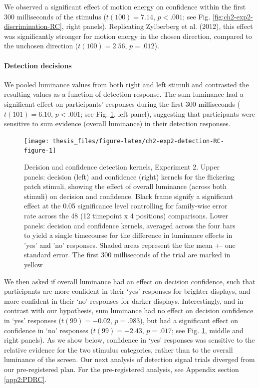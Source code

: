 \documentclass[12pt,twoside]{reedthesis}
\begin{document}
We observed a significant effect of motion energy on confidence within the first 300 milliseconds of the stimulus (\(t(100) = 7.14\), \(p < .001\); see Fig. \ref{fig:ch2-exp2-discrimination-RC}, right panels). Replicating Zylberberg et al. (2012), this effect was significantly stronger for motion energy in the chosen direction, compared to the unchosen direction (\(t(100) = 2.56\), \(p = .012\)).

\hypertarget{e2-det-RC}{%
\paragraph{Detection decisions}\label{e2-det-RC}}

We pooled luminance values from both right and left stimuli and contrasted the resulting values as a function of detection response. The sum luminance had a significant effect on participants' responses during the first 300 milliseconds (\(t(101) = 6.10\), \(p < .001\); see Fig. \ref{fig:ch2-exp2-detection-RC-figure}, left panel), suggesting that participants were sensitive to sum evidence (overall luminance) in their detection responses.
\begin{figure}
\texttt{[image: thesis\_files/figure-latex/ch2-exp2-detection-RC-figure-1]} \caption[Decision kernels in detection, Exp. 2]{Decision and confidence detection kernels, Experiment 2. Upper panels: decision (left) and confidence (right) kernels for the flickering patch stimuli, showing the effect of overall luminance (across both stimuli) on decision and confidence. Black frame signify a significant effect at the 0.05 significance level controlling for family-wise error rate across the 48 (12 timepoint x 4 positions) comparisons. Lower panels: decision and confidence kernels, averaged across the four bars to yield a single timecourse for the difference in luminance effects in 'yes' and 'no' responses. Shaded areas represent the the mean +- one standard error. The first 300 milliseconds of the trial are marked in yellow}\label{fig:ch2-exp2-detection-RC-figure}
\end{figure}
We then asked if overall luminance had an effect on decision confidence, such that participants are more confident in their `yes' responses for brighter displays, and more confident in their `no' responses for darker displays. Interestingly, and in contrast with our hypothesis, sum luminance had no effect on decision confidence in `yes' responses (\(t(99) = -0.02\), \(p = .983\)), but had a significant effect on confidence in `no' responses (\(t(99) = -2.43\), \(p = .017\); see Fig. \ref{fig:ch2-exp2-detection-RC-figure}, middle and right panels). As we show below, confidence in `yes' responses was sensitive to the relative evidence for the two stimulus categories, rather than to the overall luminance of the screen. Our next analysis of detection signal trials diverged from our pre-registered plan. For the pre-registered analysis, see Appendix section \ref{app2:PDRC}.
\end{document}
